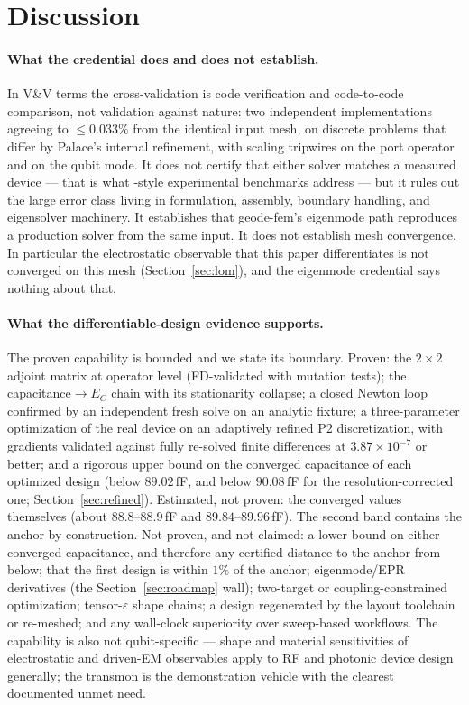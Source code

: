 \documentclass{anvil-paper}
\begin{document}
\section{Discussion}
\label{sec:discussion}

\paragraph{What the credential does and does not establish.}
In V\&V terms \citep{roache1997quantification,oberkampf2010verification}
the cross-validation is code verification and code-to-code comparison,
not validation against nature: two independent implementations agreeing
to $\leq 0.033\%$ from the identical input mesh, on discrete problems
that differ by Palace's internal refinement, with scaling tripwires on
the port operator and on the qubit mode. It does not certify that either
solver matches a measured device --- that is what
\citet{ye2025electromagnetic}-style experimental benchmarks address ---
but it rules out the large error class living in formulation, assembly,
boundary handling, and eigensolver machinery. It establishes that
geode-fem's eigenmode path reproduces a production solver from the same
input. It does not establish mesh convergence. In particular the
electrostatic observable that this paper differentiates is not
converged on this mesh (Section~\ref{sec:lom}), and the eigenmode
credential says nothing about that.

\paragraph{What the differentiable-design evidence supports.}
The proven capability is bounded and we state its boundary. Proven: the
$2\times 2$ adjoint matrix at operator level (FD-validated with mutation
tests); the capacitance$\to E_C$ chain with its stationarity collapse;
a closed Newton loop confirmed by an independent fresh solve on an
analytic fixture; a three-parameter optimization of the real device on
an adaptively refined P2 discretization, with gradients validated
against fully re-solved finite differences at $3.87\times10^{-7}$ or
better; and a rigorous upper bound on the converged capacitance of each
optimized design (below $89.02$\,fF, and below $90.08$\,fF for the
resolution-corrected one; Section~\ref{sec:refined}).
Estimated, not proven: the converged values themselves (about
$88.8$--$88.9$\,fF and $89.84$--$89.96$\,fF). The second band contains
the anchor by construction.
Not proven, and not claimed: a lower bound on either converged
capacitance, and therefore any certified distance to the anchor from
below; that the first design is within $1\%$ of the anchor;
eigenmode/EPR derivatives (the Section~\ref{sec:roadmap} wall);
two-target or coupling-constrained optimization;
tensor-$\varepsilon$ shape chains; a design regenerated by the layout
toolchain or re-meshed; and any wall-clock superiority
over sweep-based workflows. The capability is also not qubit-specific
--- shape and material sensitivities of electrostatic and driven-EM
observables apply to RF and photonic device design generally; the
transmon is the demonstration vehicle with the clearest documented
unmet need.
\end{document}
